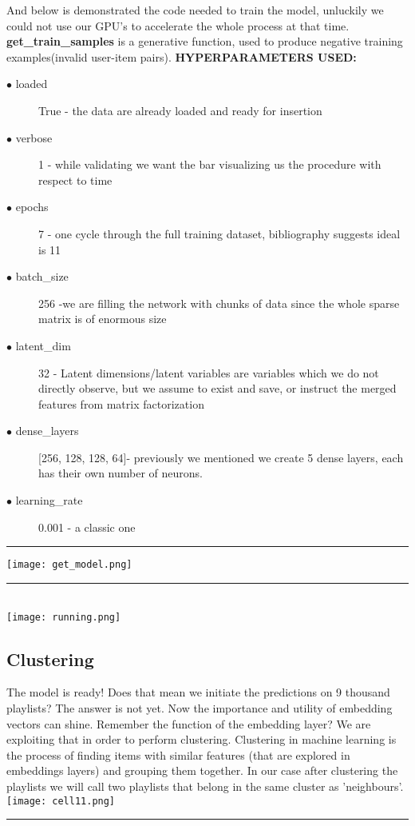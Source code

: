 \documentclass[]{article}
\begin{document}
And below is demonstrated the code needed to train the model, unluckily we could not use our GPU's to accelerate the whole process at that time. \textbf{get\_train\_samples} is a generative function, used to produce negative training examples(invalid user-item pairs). \textbf{HYPERPARAMETERS USED:} \begin{description}
	\item [$\bullet$ loaded] True - the data are already loaded and ready for insertion
	\item [$\bullet$ verbose] 1 - while validating we want the bar visualizing us the procedure with respect to time
	\item [$\bullet$ epochs] 7 - one cycle through the full training dataset, bibliography suggests ideal is 11
	\item [$\bullet$ batch\_size] 256 -we are filling the network with chunks of data since the whole sparse matrix is of enormous size
	\item [$\bullet$ latent\_dim] 32 - Latent dimensions/latent variables are variables which we do not directly observe, but we assume to exist and save, or instruct the merged features from matrix factorization 
	\item [$\bullet$ dense\_layers] [256, 128, 128, 64]- previously we mentioned we create 5 dense layers, each has their own number of neurons.
	\item [$\bullet$ learning\_rate] 0.001 - a classic one
\end{description}

\noindent
{\color{Blue} \rule{\linewidth}{0.5mm}}
\texttt{[image: get\_model.png]}
\noindent
{\color{Blue} \rule{\linewidth}{0.5mm}}
\\
\texttt{[image: running.png]}
\subsection{Clustering}
The model is ready! Does that mean we initiate the predictions on 9 thousand playlists? The answer is not yet. Now the importance and utility of embedding vectors can shine. Remember the function of the embedding layer? We are exploiting that in order to perform clustering. Clustering in machine learning is the process of finding items with similar features (that are explored in embeddings layers) and grouping them together. In our case after clustering the playlists we will call two playlists that belong in the same cluster as 'neighbours'. 
\\
\texttt{[image: cell11.png]}
\noindent
{\color{blue} \rule{\linewidth}{0.4mm}}
\\
\end{document}

